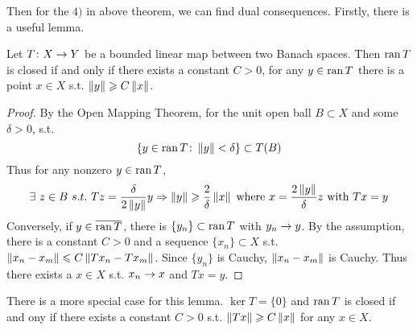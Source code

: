 \documentclass[a4paper,11pt]{report}
\begin{document}
Then for the $4)$ in above theorem, we can find dual consequences. Firstly, there is a useful lemma.

\begin{lem} \label{lem1}
	Let $T \colon X \rightarrow Y$ be a bounded linear map between two Banach spaces. Then $\operatorname{ran}{T}$ is closed if and only if there exists a constant $C>0$, for any $y \in \operatorname{ran}{T}$ there is a point $x \in X$ s.t. $\left\lVert y\right\lVert \geqslant C \left\lVert x\right\lVert$.
\end{lem}
\begin{proof}
	By the Open Mapping Theorem, for the unit open ball $B \subset X$ and some $\delta > 0$, s.t.
	\begin{equation*}
		\{y \in \operatorname{ran}{T} \colon \left\lVert y\right\lVert < \delta\} \subset T(B)
	\end{equation*}
	Thus for any nonzero $y \in \operatorname{ran}{T}$,
	\begin{equation*}
		\exists~ z \in B ~s.t.~ Tz = \frac{\delta}{2\left\lVert y\right\lVert}y \Rightarrow \left\lVert y\right\lVert \geqslant \frac{2}{\delta}\left\lVert x\right\lVert \text{~where~} x = \frac{2\left\lVert y\right\lVert}{\delta} z \text{~with~} Tx = y
	\end{equation*}
	Conversely, if $y \in \overline{\operatorname{ran}{T}}$, there is $\{y_n\} \subset \operatorname{ran}{T}$ with $y_n \rightarrow y$. By the assumption, there is a constant $C>0$ and a sequence $\{x_n\} \subset X$ s.t. $\left\lVert x_n-x_m\right\lVert \leqslant C\left\lVert Tx_n-Tx_m\right\lVert$. Since $\{y_n\}$ is Cauchy, $\left\lVert x_n-x_m\right\lVert$ is Cauchy. Thus there exists a $x \in X$ s.t. $x_n \rightarrow x$ and $Tx=y$.
\end{proof}
\begin{rem}
	There is a more special case for this lemma. $\ker{T}=\{0\}$ and $\operatorname{ran}{T}$ is closed if and ony if there exists a constant $C>0$ s.t. $\left\lVert Tx\right\lVert \geqslant C\left\lVert x\right\lVert$ for any $x \in X$.
\end{rem}
\end{document}
